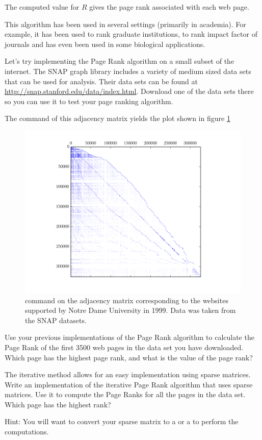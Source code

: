 The computed value for $R$ gives the page rank associated with each web page.

This algorithm has been used in several settings (primarily in academia).
For example, it has been used to rank graduate institutions, to rank impact factor of journals and has even been used in some biological applications.

Let's try implementing the Page Rank algorithm on a small subset of the internet.
The SNAP graph library includes a variety of medium sized data sets that can be used for analysis.
Their data sets can be found at \url{http://snap.stanford.edu/data/index.html}.
Download one of the data sets there so you can use it to test your page ranking algorithm.

The  command of this adjacency matrix yields the plot shown in figure \ref{fig:WebSparse}

\begin{figure}
\centering
\includegraphics[width=\textwidth]{sparse_web.png}
\caption{ command on the adjacency matrix corresponding to the websites supported by Notre Dame University in 1999.
Data was taken from the SNAP datasets.}
\label{fig:WebSparse}
\end{figure}

\begin{problem}
Use your previous implementations of the Page Rank algorithm to calculate the Page Rank of the first 3500 web pages in the data set you have downloaded.
Which page has the highest page rank, and what is the value of the page rank?
\label{prob:pg_calc}
\end{problem}

\begin{problem}
The iterative method allows for an easy implementation using sparse matrices.
Write an implementation of the iterative Page Rank algorithm that uses sparse matrices.
Use it to compute the Page Ranks for all the pages in the data set.
Which page has the highest rank?

Hint: You will want to convert your sparse matrix to a  or a  to perform the computations.
\end{problem}
